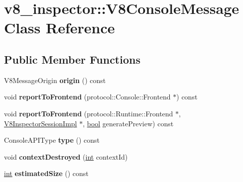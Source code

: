 \hypertarget{classv8__inspector_1_1V8ConsoleMessage}{}\section{v8\+\_\+inspector\+:\+:V8\+Console\+Message Class Reference}
\label{classv8__inspector_1_1V8ConsoleMessage}
\subsection*{Public Member Functions}
\begin{DoxyCompactItemize}
\item 
\mbox{\label{classv8__inspector_1_1V8ConsoleMessage_a269b50c4a6cb4020fb600dfe631ae82e}} 
V8\+Message\+Origin {\bfseries origin} () const
\item 
\mbox{\label{classv8__inspector_1_1V8ConsoleMessage_a331b63100d4f775416d92980d5dfa604}} 
void {\bfseries report\+To\+Frontend} (protocol\+::\+Console\+::\+Frontend $\ast$) const
\item 
\mbox{\label{classv8__inspector_1_1V8ConsoleMessage_a9c21e8be56ae9c2b4c9276834b2ec545}} 
void {\bfseries report\+To\+Frontend} (protocol\+::\+Runtime\+::\+Frontend $\ast$, \mbox{\hyperlink{classv8__inspector_1_1V8InspectorSessionImpl}{V8\+Inspector\+Session\+Impl}} $\ast$, \mbox{\hyperlink{classbool}{bool}} generate\+Preview) const
\item 
\mbox{\label{classv8__inspector_1_1V8ConsoleMessage_a913389a9ceda549c6ee9c8861c179da2}} 
Console\+A\+P\+I\+Type {\bfseries type} () const
\item 
\mbox{\label{classv8__inspector_1_1V8ConsoleMessage_a1ce68b7dad1fe8b84fa80ee884e36c12}} 
void {\bfseries context\+Destroyed} (\mbox{\hyperlink{classint}{int}} context\+Id)
\item 
\mbox{\label{classv8__inspector_1_1V8ConsoleMessage_adaabcfe6f95abbd2ea35985bf404a41a}} 
\mbox{\hyperlink{classint}{int}} {\bfseries estimated\+Size} () const
\end{DoxyCompactItemize}
